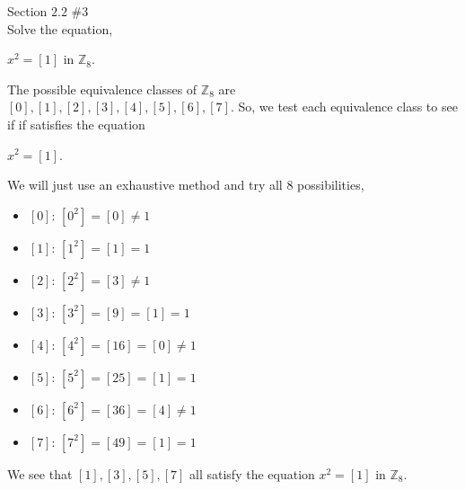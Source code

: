 \documentclass[12pt]{article}
\newcommand{\Z}{\mathbb{Z}}
\newenvironment{problem}[2][Problem]{\begin{trivlist}
\item[\hskip \labelsep {\bfseries #1}\hskip \labelsep {\bfseries #2.}]}{\end{trivlist}}
\begin{document}
\begin{problem}{7} Section $2.2$ $\#3$ \\

\noindent
Solve the equation, \\
\begin{center}
$x^2 = [1]$ in $\Z_8$. \\
\end{center}
\noindent
The possible equivalence classes of $\Z_8$ are $[0],[1],[2],[3],[4],[5],[6],[7]$. So, we test each equivalence class to see if if satisfies the equation
\begin{center}
$x^2 = [1]$.
\end{center}
\noindent
We will just use an exhaustive method and try all $8$ possibilities,
\renewcommand\labelitemi{\tiny$\bullet$}
\begin{itemize}
\item $[0]$: $[0^2]=[0] \neq 1$ \\
\item $[1]$: $[1^2]=[1] = 1$ \\
\item $[2]$: $[2^2]=[3] \neq 1$ \\
\item $[3]$: $[3^2]=[9]=[1]=1$ \\
\item $[4]$: $[4^2]=[16]=[0]\neq 1$ \\
\item $[5]$: $[5^2]=[25]=[1]=1$ \\
\item $[6]$: $[6^2]=[36]=[4] \neq 1$ \\
\item $[7]$: $[7^2]=[49]=[1] = 1$
\end{itemize}
\noindent
We see that $[1],[3],[5],[7]$ all satisfy the equation $x^2 = [1]$ in $\Z_8$. \qedsymbol
\end{problem}

\newpage
\end{document}
